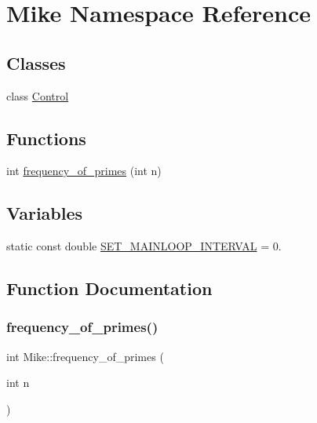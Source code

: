 \hypertarget{namespace_mike}{}\section{Mike Namespace Reference}
\label{namespace_mike}
\subsection*{Classes}
\begin{DoxyCompactItemize}
\item 
class \hyperlink{class_mike_1_1_control}{Control}
\end{DoxyCompactItemize}
\subsection*{Functions}
\begin{DoxyCompactItemize}
\item 
int \hyperlink{namespace_mike_ada7afe897748f668730c74456952e356}{frequency\+\_\+of\+\_\+primes} (int n)
\end{DoxyCompactItemize}
\subsection*{Variables}
\begin{DoxyCompactItemize}
\item 
static const double \hyperlink{namespace_mike_abbeda217f93388b7dd036c32d183f426}{S\+E\+T\+\_\+\+M\+A\+I\+N\+L\+O\+O\+P\+\_\+\+I\+N\+T\+E\+R\+V\+AL} = 0.
\end{DoxyCompactItemize}


\subsection{Function Documentation}
\mbox{\label{namespace_mike_ada7afe897748f668730c74456952e356}} 
\subsubsection{\texorpdfstring{frequency\+\_\+of\+\_\+primes()}{frequency\_of\_primes()}}
{\footnotesize\ttfamily int Mike\+::frequency\+\_\+of\+\_\+primes (\begin{DoxyParamCaption}\item[{int}]{n }\end{DoxyParamCaption})}

